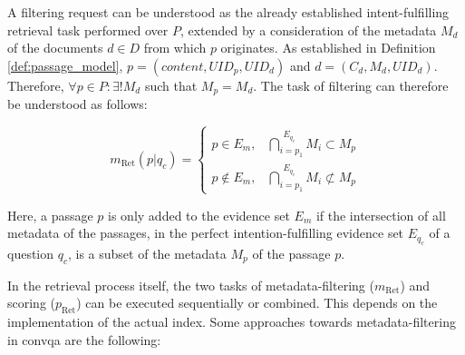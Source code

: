 A filtering request can be understood as the already established intent-fulfilling retrieval task performed over $P$, extended by a consideration of the metadata $M_d$ of the documents $d \in D$ from which $p$ originates. As established in Definition \ref{def:passage_model}, $p = (content, UID_p, UID_d)$ and $d = (C_d, M_d, UID_d)$. Therefore, $\forall p \in P: \exists! M_d$ such that $M_p = M_d$. The task of filtering can therefore be understood as follows:

\begin{equation}
    m_{\text{Ret}}(p|q_c) =
    \begin{cases}
        p \in E_m, & \bigcap\limits_{i=p_1}^{\substack{E_{q_c}}} M_{i} \subset M_p \\
        p \notin E_m, & \bigcap\limits_{i=p_1}^{\substack{E_{q_c}}} M_{i} \not\subset M_p
    \end{cases}
\end{equation}

Here, a passage $p$ is only added to the evidence set $E_m$ if the intersection of all metadata of the passages, in the perfect intention-fulfilling evidence set $E_{q_c}$ of a question $q_c$, is a subset of the metadata $M_p$ of the passage $p$.

In the retrieval process itself, the two tasks of metadata-filtering ($m_{\text{Ret}}$) and scoring ($p_{\text{Ret}}$) can be executed sequentially or combined. This depends on the implementation of the actual index. Some approaches towards metadata-filtering in \gls{convqa} are the following:

